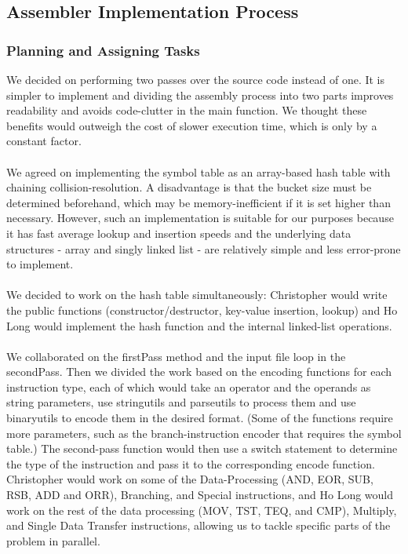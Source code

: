 \documentclass[11pt,twoside]{article}
\begin{document}
\subsection{Assembler Implementation Process}
\subsubsection{Planning and Assigning Tasks}
We decided on performing two passes over the source code instead of one. It is simpler to implement and dividing the assembly process into two parts improves readability and avoids code-clutter in the main function. We thought these benefits would outweigh the cost of slower execution time, which is only by a constant factor.
\\\\
We agreed on implementing the symbol table as an array-based hash table with chaining collision-resolution. A disadvantage is that the bucket size must be determined beforehand, which may be memory-inefficient if it is set higher than necessary. However, such an implementation is suitable for our purposes because it has fast average lookup and insertion speeds and the underlying data structures - array and singly linked list - are relatively simple and less error-prone to implement.
\\\\
We decided to work on the hash table simultaneously: Christopher would write the public functions (constructor/destructor, key-value insertion, lookup) and Ho Long would implement the hash function and the internal linked-list operations.
\\\\
We collaborated on the firstPass method and the input file loop in the secondPass. Then we divided the work based on the encoding functions for each instruction type, each of which would take an operator and the operands as string parameters, use string\textunderscore utils and parse\textunderscore utils to process them and use binary\textunderscore utils to encode them in the desired format. (Some of the functions require more parameters, such as the branch-instruction encoder that requires the symbol table.) The second-pass function would then use a switch statement to determine the type of the instruction and pass it to the corresponding encode function. Christopher would work on some of the Data-Processing (AND, EOR, SUB, RSB, ADD and ORR), Branching, and Special instructions, and Ho Long would work on the rest of the data processing (MOV, TST, TEQ, and CMP), Multiply, and Single Data Transfer instructions, allowing us to tackle specific parts of the problem in parallel.
\end{document}

